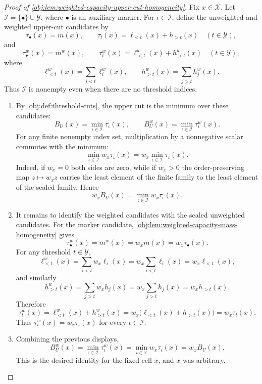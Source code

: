 \documentclass[11pt]{article}
\begin{document}
\begin{proof}[Proof of \cref{obj:lem:weighted-capacity-upper-cut-homogeneity}]
Fix \(x\in\mathcal X\).  Let \(\mathcal I=\{\bullet\}\cup\mathcal Y\), where \(\bullet\) is an auxiliary marker.  For \(\iota\in\mathcal I\), define the unweighted and weighted upper-cut candidates by
\[
\tau_{\bullet}(x)=m(x),
\qquad
\tau_t(x)=\ell_{<t}(x)+h_{>t}(x)\quad(t\in\mathcal Y),
\]
and
\[
\tau^w_{\bullet}(x)=m^w(x),
\qquad
\tau^w_t(x)=\ell^w_{<t}(x)+h^w_{>t}(x)\quad(t\in\mathcal Y),
\]
where
\[
\ell^w_{<t}(x)=\sum_{i<t}\ell^w_i(x),
\qquad
h^w_{>t}(x)=\sum_{j>t}h^w_j(x).
\]
Thus \(\mathcal I\) is nonempty even when there are no threshold indices.

\begin{enumerate}
\item By \cref{obj:def:threshold-cuts}, the upper cut is the minimum over these candidates:
\[
B_U(x)=\min_{\iota\in\mathcal I}\tau_{\iota}(x),
\qquad
B_U^w(x)=\min_{\iota\in\mathcal I}\tau^w_{\iota}(x).
\]
For any finite nonempty index set, multiplication by a nonnegative scalar commutes with the minimum:
\[
\min_{\iota\in\mathcal I} w_x\tau_{\iota}(x)
=
w_x\min_{\iota\in\mathcal I}\tau_{\iota}(x).
\]
Indeed, if \(w_x=0\) both sides are zero, while if \(w_x>0\) the order-preserving map \(z\mapsto w_xz\) carries the least element of the finite family to the least element of the scaled family.  Hence
\[
w_x B_U(x)
=
\min_{\iota\in\mathcal I} w_x\tau_{\iota}(x).
\]

\item It remains to identify the weighted candidates with the scaled unweighted candidates.  For the marker candidate, \cref{obj:lem:weighted-capacity-mass-homogeneity} gives
\[
\tau^w_{\bullet}(x)=m^w(x)=w_xm(x)=w_x\tau_{\bullet}(x).
\]
For any threshold \(t\in\mathcal Y\),
\[
\ell^w_{<t}(x)
=
\sum_{i<t} w_x\ell_i(x)
=
w_x\sum_{i<t}\ell_i(x)
=
w_x\ell_{<t}(x),
\]
and similarly
\[
h^w_{>t}(x)
=
\sum_{j>t} w_xh_j(x)
=
w_x\sum_{j>t}h_j(x)
=
w_xh_{>t}(x).
\]
Therefore
\[
\tau^w_t(x)
=
\ell^w_{<t}(x)+h^w_{>t}(x)
=
w_x\bigl(\ell_{<t}(x)+h_{>t}(x)\bigr)
=
w_x\tau_t(x).
\]
Thus \(\tau^w_{\iota}(x)=w_x\tau_{\iota}(x)\) for every \(\iota\in\mathcal I\).

\item Combining the previous displays,
\[
B_U^w(x)
=
\min_{\iota\in\mathcal I}\tau^w_{\iota}(x)
=
\min_{\iota\in\mathcal I}w_x\tau_{\iota}(x)
=
w_xB_U(x).
\]
This is the desired identity for the fixed cell \(x\), and \(x\) was arbitrary.
\end{enumerate}
\end{proof}
\end{document}
